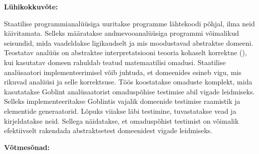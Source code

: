 \documentclass[../thesis.tex]{subfiles}
\begin{document}
\newpage
{}

\noindent\textbf{\large \mytitle}
\vspace*{1ex}

\noindent\textbf{Lühikokkuvõte:} 

\noindent
Staatilise programmianalüüsiga uuritakse programme lähtekoodi põhjal, ilma neid käivitamata.
Selleks määratakse andmevooanalüüsiga programmi võimalikud seisundid, mida vaadeldakse ligikaudselt ja mis moodustavad abstraktse domeeni. Teostatav analüüs on abstraktse interpretatsiooni teooria kohaselt korrektne (), kui kasutatav domeen rahuldab teatud matemaatilisi omadusi.
Staatilise analüsaatori implementeerimisel võib juhtuda, et domeenides esineb vigu, mis rikuvad analüüsi ja selle korrektsuse.
Töös koostatakse omaduste komplekt, mida kasutatakse Goblint analüsaatorist omaduspõhise testimise abil vigade leidmiseks.
Selleks implementeeritakse Goblintis vajalik domeenide testimise raamistik ja elementide generaatorid. Lõpuks viiakse läbi testimine, tuvastatakse vead ja kirjeldatakse neid.
Sellega näidatakse, et omaduspõhist testimist on võimalik efektiivselt rakendada abstraktsetest domeenidest vigade leidmiseks.

\vspace*{1ex}

\noindent\textbf{Võtmesõnad:}\\
\mykeywords

\vspace*{1ex}
\end{document}
